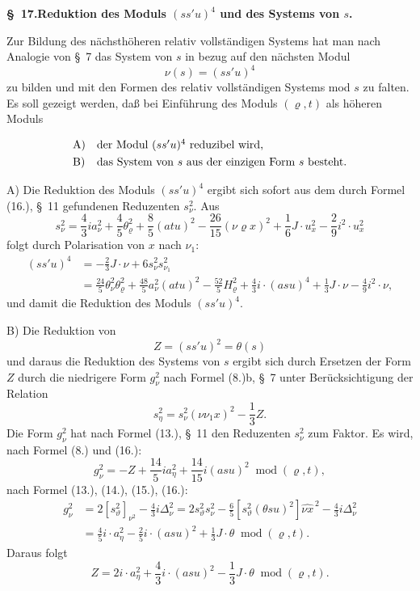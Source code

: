 \documentclass[11pt]{article}
\newcommand{\A}{\Delta}
\newcommand{\modu}[1]{\;\operatorname{mod} #1}
\providecommand{\modu}[1]{\;\operatorname{mod} #1}
\begin{document}
\begin{center}
\textbf{\S\ 17.\quad Reduktion des Moduls $(ss'u)^4$ und des Systems von $s$.}
\end{center}

Zur Bildung des nächsthöheren relativ vollständigen Systems hat man nach Analogie von \S\ 7 das System von $s$ in bezug auf den nächsten Modul
\[
\nu(s)=(ss'u)^4
\]
zu bilden und mit den Formen des relativ vollständigen Systems mod $s$ zu falten. Es soll gezeigt werden, daß bei Einführung des Moduls $(\varrho,t)$ als höheren Moduls
\[
\begin{array}{ll}
\text{A)}&\text{der Modul }(ss'u)^4\text{ reduzibel wird,}\vphantom{\dfrac11}\\
\text{B)}&\text{das System von }s\text{ aus der einzigen Form }s\text{ besteht.}
\end{array}
\]

A) Die Reduktion des Moduls $(ss'u)^4$ ergibt sich sofort aus dem durch Formel (16.), \S\ 11 gefundenen Reduzenten $s_\nu^2$. Aus
\[
 s_\nu^2=\frac43 i a_\nu^2+\frac45\theta_\varrho^2+\frac85(atu)^2-
 \frac{26}{15}(\nu\varrho x)^2+\frac16J\cdot u_x^2-
 \frac29i^2\cdot u_x^2
\]
folgt durch Polarisation von $x$ nach $\nu_1$:
\[
\tag{21}
\begin{aligned}
(ss'u)^4&=-\frac23J\cdot\nu+6s_\nu^2s_{\nu_1}^2\\
&=\frac{24}{5}\theta_\nu^2\theta_\varrho^2+
\frac{48}{5}a_\nu^2(atu)^2-
\frac{52}{5}H_\varrho^2+
\frac43i\cdot(asu)^4+\frac13J\cdot\nu-
\frac49i^2\cdot\nu,
\end{aligned}
\]
und damit die Reduktion des Moduls $(ss'u)^4$.


B) Die Reduktion von
\[
Z=(ss'u)^2=\theta(s)
\]
und daraus die Reduktion des Systems von $s$ ergibt sich durch Ersetzen der Form $Z$ durch die niedrigere Form $g_\nu^2$ nach Formel (8.)b, \S\ 7 unter Berücksichtigung der Relation
\[
 s_\eta^2=s_\nu^2(\nu\nu_1x)^2-\frac13Z.
\]
Die Form $g_\nu^2$ hat nach Formel (13.), \S\ 11 den Reduzenten $s_\nu^2$ zum Faktor. Es wird, nach Formel (8.) und (16.):
\[
 g_\nu^2=-Z+\frac{14}{5}ia_\eta^2+\frac{14}{15}i(asu)^2
 \modu{(\varrho,t)},
\]
nach Formel (13.), (14.), (15.), (16.):
\[
\begin{aligned}
g_\nu^2&=2[s_\vartheta^2]_{\nu^2}-\frac43 i\A_\nu^2
      =2s_\vartheta^2s_\nu^2-\frac65[s_\vartheta^2(\theta su)^2]\widehat{\nu x}^{\,2}
        -\frac43i\A_\nu^2\\
&=\frac45i\cdot a_\eta^2-\frac25i\cdot(asu)^2+\frac13J\cdot\theta
\modu{(\varrho,t)}.
\end{aligned}
\]
Daraus folgt
\[
\tag{23}
 Z=2i\cdot a_\eta^2+\frac43i\cdot(asu)^2-\frac13J\cdot\theta
 \modu{(\varrho,t)}.
\]
\end{document}

